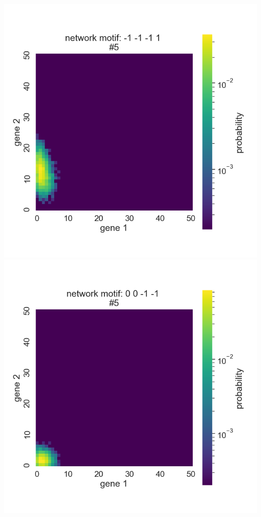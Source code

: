 \documentclass[
]{article}
\begin{document}
\includegraphics{../analysis/eda/first-set-heatmaps/sample/motif-03-i-05-row-4976.png}
\includegraphics{../analysis/eda/first-set-heatmaps/sample/motif-37-i-05-row-1663.png}
\end{document}
